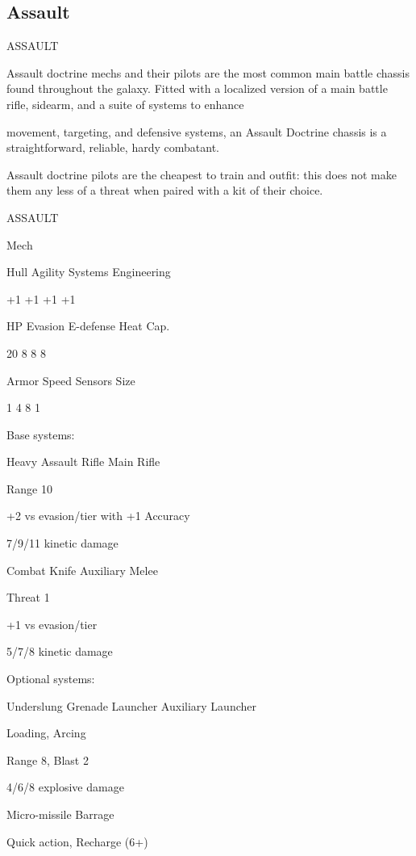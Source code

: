 \subsection{Assault}
                                                ASSAULT

Assault doctrine mechs and their pilots are the most common main battle chassis found throughout the
galaxy. Fitted with a localized version of a main battle rifle, sidearm, and a suite of systems to enhance

movement, targeting, and defensive systems, an Assault Doctrine chassis is a straightforward, reliable,
hardy combatant.

Assault doctrine pilots are the cheapest to train and outfit: this does not make them any less of a threat
when paired with a kit of their choice.

       ASSAULT

       Mech

       Hull       Agility      Systems       Engineering

       +1         +1           +1            +1

       HP         Evasion      E-defense     Heat Cap.

       20         8            8             8

       Armor      Speed        Sensors       Size

       1          4            8             1

Base systems:

Heavy Assault Rifle
Main Rifle

Range 10

+2 vs evasion/tier with +1 Accuracy

7/9/11 kinetic damage


Combat Knife
Auxiliary Melee

Threat 1

+1 vs evasion/tier

5/7/8 kinetic damage





Optional systems:

Underslung Grenade Launcher
Auxiliary Launcher

Loading, Arcing

Range 8, Blast 2

4/6/8 explosive damage


Micro-missile Barrage

Quick action, Recharge (6+)

